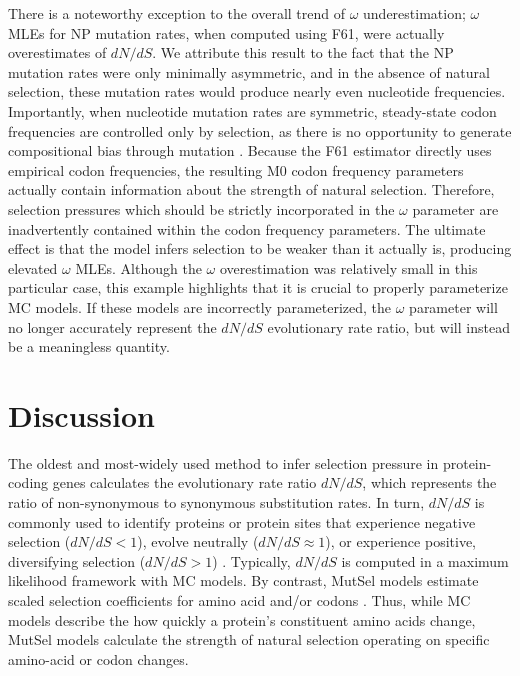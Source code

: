 \documentclass{pnastwo}
\begin{document}
\begin{article}
There is a noteworthy exception to the overall trend of $\omega$ underestimation; $\omega$ MLEs for NP mutation rates, when computed using F61, were actually overestimates of $dN/dS$. We attribute this result to the fact that the NP mutation rates were only minimally asymmetric, and in the absence of natural selection, these mutation rates would produce nearly even nucleotide frequencies. Importantly, when nucleotide mutation rates are symmetric, steady-state codon frequencies are controlled only by selection, as there is no opportunity to generate compositional bias through mutation \cite{SellaHirsh2005}. Because the F61 estimator directly uses empirical codon frequencies, the resulting M0 codon frequency parameters actually contain information about the strength of natural selection. Therefore, selection pressures which should be strictly incorporated in the $\omega$ parameter are inadvertently contained within the codon frequency parameters. The ultimate effect is that the model infers selection to be weaker than it actually is, producing elevated $\omega$ MLEs. Although the $\omega$ overestimation was relatively small in this particular case, this example highlights that it is crucial to properly parameterize MC models. If these models are incorrectly parameterized, the $\omega$ parameter will no longer accurately represent the $dN/dS$ evolutionary rate ratio, but will instead be a meaningless quantity.



\section*{Discussion}

The oldest and most-widely used method to infer selection pressure in protein-coding genes calculates the evolutionary rate ratio $dN/dS$, which represents the ratio of non-synonymous to synonymous substitution rates. In turn, $dN/dS$ is commonly used to identify proteins or protein sites that experience negative selection ($dN/dS<1$), evolve neutrally ($dN/dS\approx1$), or experience positive, diversifying selection ($dN/dS>1$) \cite{NielsenYang1998, Yangetal2000, KosakovskyPondFrost2005b}. Typically, $dN/dS$ is computed in a maximum likelihood framework with MC models. By contrast, MutSel models estimate scaled selection coefficients for amino acid and/or codons \cite{HalpernBruno1998,Rodrigueetal2010,Tamurietal2012,Thorne2012,Tamurietal2014}. Thus, while MC models describe the how quickly a protein's constituent amino acids change, MutSel models calculate the strength of natural selection operating on specific amino-acid or codon changes.  


\end{article}
\end{document}
